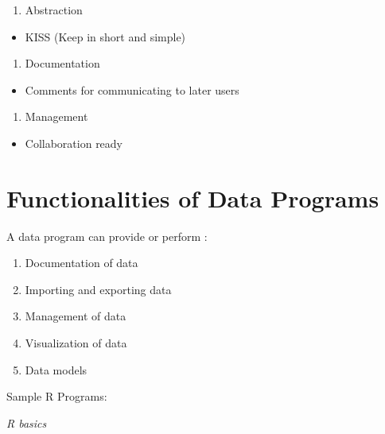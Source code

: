 \documentclass[]{book}
\providecommand{\tightlist}{%
  \setlength{\itemsep}{0pt}\setlength{\parskip}{0pt}}
\begin{document}
\begin{enumerate}
\def\labelenumi{\arabic{enumi}.}
\setcounter{enumi}{4}
\tightlist
\item
  Abstraction
\end{enumerate}

\begin{itemize}
\tightlist
\item
  KISS (Keep in short and simple)
\end{itemize}

\begin{enumerate}
\def\labelenumi{\arabic{enumi}.}
\setcounter{enumi}{5}
\tightlist
\item
  Documentation
\end{enumerate}

\begin{itemize}
\tightlist
\item
  Comments for communicating to later users
\end{itemize}

\begin{enumerate}
\def\labelenumi{\arabic{enumi}.}
\setcounter{enumi}{6}
\tightlist
\item
  Management
\end{enumerate}

\begin{itemize}
\tightlist
\item
  Collaboration ready
\end{itemize}

\hypertarget{functionalities-of-data-programs}{%
\section{Functionalities of Data Programs}\label{functionalities-of-data-programs}}

A data program can provide or perform :

\begin{enumerate}
\def\labelenumi{\arabic{enumi}.}
\tightlist
\item
  Documentation of data
\item
  Importing and exporting data
\item
  Management of data
\item
  Visualization of data
\item
  Data models
\end{enumerate}

Sample R Programs:

\emph{R basics}
\end{document}
